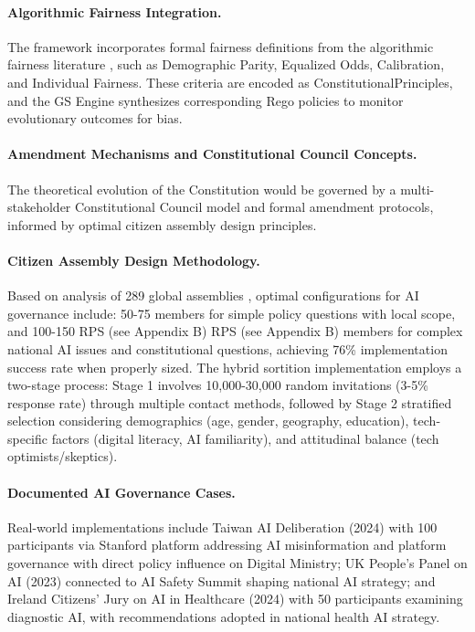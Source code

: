 \documentclass[manuscript,screen,9pt]{acmart}
\begin{document}
\paragraph{Algorithmic Fairness Integration.} The framework incorporates formal fairness definitions from the algorithmic fairness literature \cite{Barocas2023FairnessML, Hardt2016EqualityOpportunity, Chouldechova2017FairPrediction, Dwork2012DifferentialPrivacy}, such as Demographic Parity, Equalized Odds, Calibration, and Individual Fairness. These criteria are encoded as ConstitutionalPrinciples, and the GS Engine synthesizes corresponding Rego policies to monitor evolutionary outcomes for bias.

\paragraph{Amendment Mechanisms and Constitutional Council Concepts.} The theoretical evolution of the Constitution would be governed by a multi-stakeholder Constitutional Council model and formal amendment protocols, informed by optimal citizen assembly design principles.

\paragraph{Citizen Assembly Design Methodology.} Based on analysis of 289 global assemblies \cite{OECD2020CitizenParticipation}, optimal configurations for AI governance include: 50-75 members for simple policy questions with local scope, and 100-150 RPS\cite{perf-report} (see Appendix B) RPS\cite{perf-report} (see Appendix B) members for complex national AI issues and constitutional questions, achieving 76\% implementation success rate when properly sized. The hybrid sortition implementation employs a two-stage process: Stage 1 involves 10,000-30,000 random invitations (3-5\% response rate) through multiple contact methods, followed by Stage 2 stratified selection considering demographics (age, gender, geography, education), tech-specific factors (digital literacy, AI familiarity), and attitudinal balance (tech optimists/skeptics).

\paragraph{Documented AI Governance Cases.} Real-world implementations include Taiwan AI Deliberation (2024) with 100 participants via Stanford platform addressing AI misinformation and platform governance with direct policy influence on Digital Ministry; UK People's Panel on AI (2023) connected to AI Safety Summit shaping national AI strategy; and Ireland Citizens' Jury on AI in Healthcare (2024) with 50 participants examining diagnostic AI, with recommendations adopted in national health AI strategy.
\end{document}
